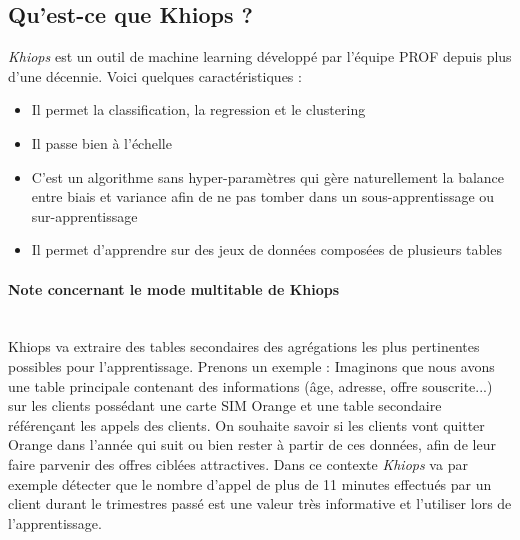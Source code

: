 \documentclass[12pt]{report}
\newcommand{\namedparagraph}[1]{\paragraph*{#1}\mbox{}\\}
\begin{document}
	\subsection{Qu'est-ce que Khiops ?}
	\textit{Khiops} est un outil de machine learning développé par l'équipe PROF depuis plus d'une décennie. Voici quelques caractéristiques :
	\begin{itemize}
		\item Il permet la classification, la regression et le clustering
		\item Il passe bien à l'échelle
		\item C'est un algorithme sans hyper-paramètres qui gère naturellement la balance entre biais et variance afin de ne pas tomber dans un sous-apprentissage ou sur-apprentissage
		\item Il permet d'apprendre sur des jeux de données composées de plusieurs tables
	\end{itemize}
	
	\namedparagraph{Note concernant le mode multitable de Khiops}
	Khiops va extraire des tables secondaires des agrégations les plus pertinentes possibles pour l'apprentissage. \newline
	Prenons un exemple : Imaginons que nous avons une table principale contenant des informations (âge, adresse, offre souscrite...) sur les clients possédant une carte SIM Orange et une table secondaire référençant les appels des clients. On souhaite savoir si les clients vont quitter Orange dans l'année qui suit ou bien rester à partir de ces données, afin de leur faire parvenir des offres ciblées attractives. Dans ce contexte \textit{Khiops} va par exemple détecter que le nombre d'appel de plus de 11 minutes effectués par un client durant le trimestres passé est une valeur très informative et l'utiliser lors de l'apprentissage.
	
\end{document}
